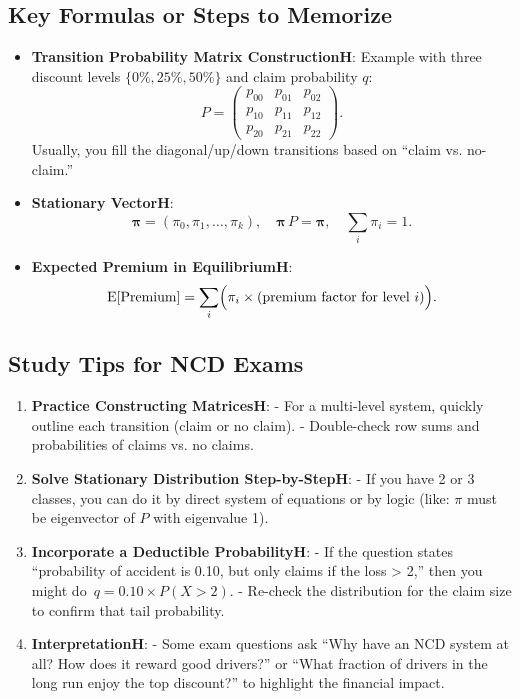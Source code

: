 \documentclass[13pt,a4paper]{article}
\begin{document}
\subsection{Key Formulas or Steps to Memorize}
\begin{itemize}
  \item \textbf{Transition Probability Matrix ConstructionH}:  
    Example with three discount levels \(\{0\%,25\%,50\%\}\) and claim probability \(q\):
    \[
      P = 
      \begin{pmatrix}
        p_{00} & p_{01} & p_{02}\\
        p_{10} & p_{11} & p_{12}\\
        p_{20} & p_{21} & p_{22}
      \end{pmatrix}.
    \]
    Usually, you fill the diagonal/up/down transitions based on “claim vs. no-claim.”
  \item \textbf{Stationary VectorH}:
    \[
      \boldsymbol{\pi} = (\pi_0, \pi_1,\ldots,\pi_k),
      \quad
      \boldsymbol{\pi}\,P=\boldsymbol{\pi},
      \quad
      \sum_i \pi_i=1.
    \]
  \item \textbf{Expected Premium in EquilibriumH}:  
    \[
      \mathrm{E}[\text{Premium}] 
      = \sum_i \Bigl(\pi_i \times (\text{premium factor for level } i)\Bigr).
    \]
\end{itemize}

\subsection{Study Tips for NCD Exams}
\begin{enumerate}
  \item \textbf{Practice Constructing MatricesH}: 
    - For a multi-level system, quickly outline each transition (claim or no claim).  
    - Double-check row sums and probabilities of claims vs. no claims.
  \item \textbf{Solve Stationary Distribution Step-by-StepH}: 
    - If you have 2 or 3 classes, you can do it by direct system of equations or by logic (like: \(\pi\) must be eigenvector of \(P\) with eigenvalue 1).
  \item \textbf{Incorporate a Deductible ProbabilityH}: 
    - If the question states “probability of accident is 0.10, but only claims if the loss > 2,” then you might do \(\,q=0.10 \times P(X>2)\).  
    - Re-check the distribution for the claim size to confirm that tail probability.
  \item \textbf{InterpretationH}:
    - Some exam questions ask “Why have an NCD system at all? How does it reward good drivers?” or “What fraction of drivers in the long run enjoy the top discount?” to highlight the financial impact.
\end{enumerate}
\end{document}
